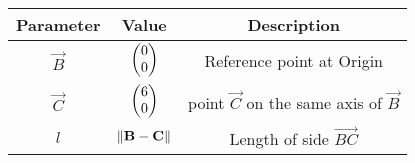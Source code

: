 \begin{tabular}{|c|c|c|}
\hline
\textbf{Parameter} & \textbf{Value} & \textbf{Description} \\
\hline
	$\vec{B}$ & $\begin{pmatrix}0\\0\end{pmatrix}$ & Reference point at Origin \\
\hline
	$\vec{C}$ & $\begin{pmatrix}6\\0\end{pmatrix}$ & point $\vec{C}$ on the same axis of $\vec{B}$ \\
\hline
    $l$ & $\left\lVert\mathbf{B}-\mathbf{C}\right\rVert$ & Length of side  $\vec{BC}$ \\
\hline
\end{tabular}
